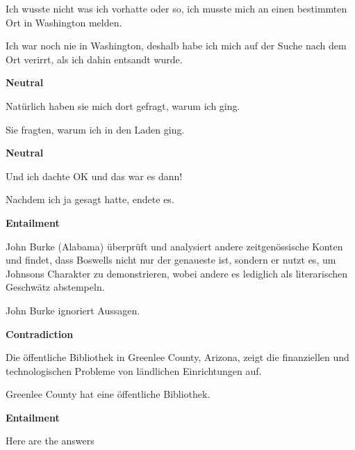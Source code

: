 
\begin{examples}
  \label{ex:xnli}
  \item Ich wusste nicht was ich vorhatte oder so, ich musste mich an einen bestimmten Ort in Washington melden.

        Ich war noch nie in Washington, deshalb habe ich mich auf der Suche nach dem Ort verirrt, als ich dahin entsandt wurde.

        \textbf{Neutral}
  \item Natürlich haben sie mich dort gefragt, warum ich ging.

        Sie fragten, warum ich in den Laden ging.

        \textbf{Neutral}
  \item Und ich dachte OK und das war es dann!

        Nachdem ich ja gesagt hatte, endete es.

        \textbf{Entailment}
  \item John Burke (Alabama) überprüft und analysiert andere zeitgenössische Konten und findet, dass Boswells nicht nur der genaueste ist, sondern er nutzt es, um Johnsons Charakter zu demonstrieren, wobei andere es lediglich als literarischen Geschwätz abstempeln.

        John Burke ignoriert Aussagen.

        \textbf{Contradiction}
  \item Die öffentliche Bibliothek in Greenlee County, Arizona, zeigt die finanziellen und technologischen Probleme von ländlichen Einrichtungen auf.

        Greenlee County hat eine öffentliche Bibliothek.

        \textbf{Entailment}
\end{examples}

Here are the answers

